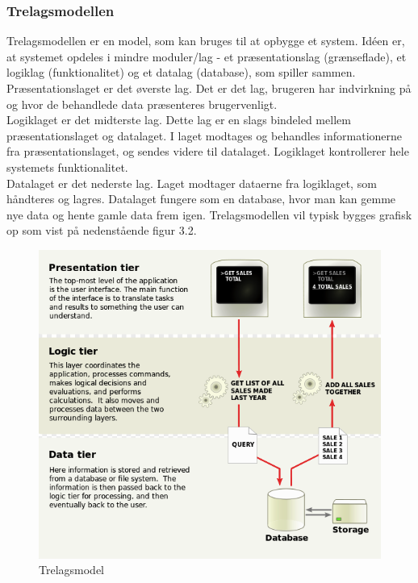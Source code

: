 \subsubsection{Trelagsmodellen}
Trelagsmodellen er en model, som kan bruges til at opbygge et system. Idéen er, at systemet opdeles i mindre moduler/lag - et præsentationslag (grænseflade), et logiklag (funktionalitet) og et datalag (database), som spiller sammen. \\
Præsentationslaget er det øverste lag. Det er det lag, brugeren har indvirkning på og hvor de behandlede data præsenteres brugervenligt. \\
Logiklaget er det midterste lag. Dette lag er en slags bindeled mellem præsentationslaget og datalaget. I laget modtages og behandles informationerne fra præsentationslaget, og sendes videre til datalaget. Logiklaget kontrollerer hele systemets funktionalitet.\\
Datalaget er det nederste lag. Laget modtager dataerne fra logiklaget, som håndteres og lagres. Datalaget fungere som en database, hvor man kan gemme nye data og hente gamle data frem igen. Trelagsmodellen vil typisk bygges grafisk op som vist på nedenstående figur 3.2.\\

\begin{figure}[H]
	\centering
	\includegraphics[width=1\textwidth]{Figurer/Snip20150415_39}
	\caption{Trelagsmodel\protect\footnotemark}
\end{figure}


